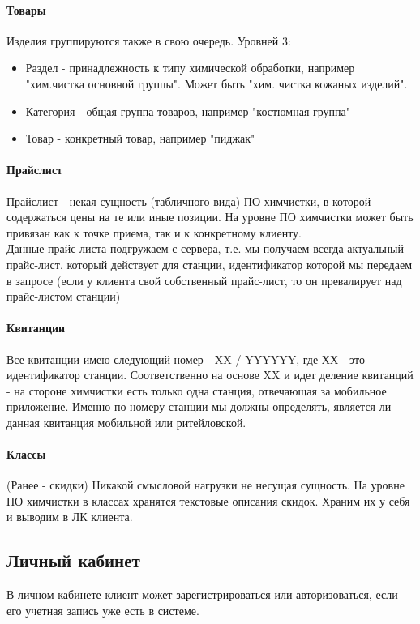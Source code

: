 \documentclass[DIV=calc, paper=a4, fontsize=11pt]{scrartcl} %
\begin{document}
\paragraph{Товары}\label{paragraph:goods}
Изделия группируются также в свою очередь. Уровней 3:
\begin{itemize}
	\item Раздел - принадлежность к типу химической обработки, например "хим.чистка основной группы". Может быть "хим. чистка кожаных изделий".
	\item Категория - общая группа товаров, например "костюмная группа"
	\item Товар - конкретный товар, например "пиджак"
\end{itemize}

\paragraph{Прайслист}
Прайслист - некая сущность (табличного вида) ПО химчистки, в которой содержаться цены на те или иные позиции. На уровне ПО химчистки может быть привязан как к точке приема, так и к конкретному клиенту. 
\\[0.5cm]
Данные прайс-листа подгружаем с сервера, т.е. мы получаем всегда актуальный прайс-лист, который действует для станции, идентификатор которой мы передаем в запросе (если у клиента свой собственный прайс-лист, то он превалирует над прайс-листом станции)

\paragraph{Квитанции}
Все квитанции имею следующий номер - XX / YYYYYY, где ХХ - это идентификатор станции. Соответственно на основе XX и идет деление квитанций - на стороне химчистки есть только одна станция, отвечающая за мобильное приложение. Именно по номеру станции мы должны определять, является ли данная квитанция мобильной или ритейловской.

\paragraph{Классы}
(Ранее - скидки) Никакой смысловой нагрузки не несущая сущность. На уровне ПО химчистки в классах хранятся текстовые описания скидок. Храним их у себя и выводим в ЛК клиента.

\subsection{Личный кабинет}
В личном кабинете клиент может зарегистрироваться или авторизоваться, если его учетная запись уже есть в системе.
\end{document}

